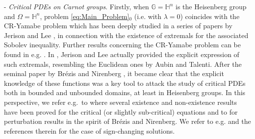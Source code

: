 \documentclass[11pt]{amsart}
\numberwithin{equation}{section} %
\theoremstyle{definition}
\begin{document}
\noindent-\,\,\emph{Critical PDEs on Carnot groups}.
Firstly, when $\mathbb{G}= \mathbb{H}^{n}$ is the Heisenberg group and $\Omega = \mathbb{H}^n$, problem \eqref{eq:Main_Problem}$_0$ (i.e. with $\lambda =0$) coincides with the CR-Yamabe problem which has been deeply studied in a series of papers by Jerison and Lee \cite{JerisonLee, JerisonLee2, JerisonLee3}, in connection with the existence of extremals for the associated Sobolev inequality. Further results concerning the CR-Yamabe problem can be found in e.g. \cite{Gamara,GaYa,ChMaYa}. In \cite{JerisonLee2}, Jerison and Lee actually provided the explicit expression of such extremals, resembling the Euclidean ones by Aubin and Talenti. After the seminal paper by Br\'{e}zis and Nirenberg \cite{BN}, it  became clear that the explicit knowledge of these functions was a key tool to attack the study of critical PDEs both in bounded and unbounded domains, at least in Heisenberg groups.
 In this perspective, we refer e.g.~to \cite{GaLa, BiCa, LuWei, BrRiSe, BiPr, Ugu1, Ugu2, LaUg, CitUg, MaUg, FelliUgu, MaMaPi, PaPiTe} where several existence and non-existence results have been proved for the critical (or slightly sub-critical) equations and to
\cite{Citti, GaUg, MaMa} for perturbation results in the spirit of Br\'{e}zis and Nirenberg. We refer to e.g. \cite{MaMaTr, MolicaRepovs} and the references therein for the case of sign-changing solutions.
\end{document}
